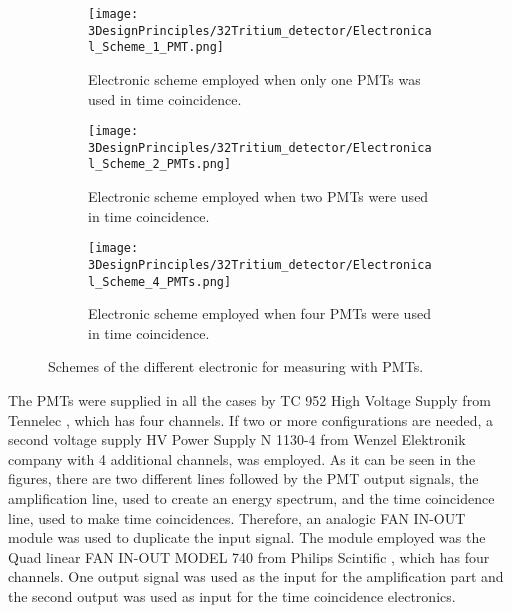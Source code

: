 \begin{figure}
\centering
    \begin{subfigure}[b]{1.0\textwidth}
    \centering
    \texttt{[image: 3DesignPrinciples/32Tritium\_detector/Electronical\_Scheme\_1\_PMT.png]}  
    \caption{Electronic scheme employed when only one PMTs was used in time coincidence.\label{subfig:ElectronicConfiguraiton1PMT}}
    \end{subfigure}
    \hfill
    \begin{subfigure}[b]{1.0\textwidth}
    \centering
    \texttt{[image: 3DesignPrinciples/32Tritium\_detector/Electronical\_Scheme\_2\_PMTs.png]}  
    \caption{Electronic scheme employed when two PMTs were used in time coincidence.\label{subfig:ElectronicConfiguraiton2PMT}}
    \end{subfigure}
    \hfill
    \begin{subfigure}[b]{1.0\textwidth}
    \centering
    \texttt{[image: 3DesignPrinciples/32Tritium\_detector/Electronical\_Scheme\_4\_PMTs.png]}  
    \caption{Electronic scheme employed when four PMTs were used in time coincidence.\label{subfig:ElectronicConfiguraiton4PMT}}
    \end{subfigure}
 \caption{Schemes of the different electronic for measuring with PMTs.}
 \label{fig:ElectronicConfiguraitonsPMT}
\end{figure}

The PMTs were supplied in all the cases by TC 952 High Voltage Supply from Tennelec \cite{DataSheetHVSupplyTennelec}, which has four channels. If two or more configurations are needed, a second voltage supply HV Power Supply N 1130-4 from Wenzel Elektronik company \cite{DataSheetHVSupplyWenzel} with 4 additional channels, was employed. As it can be seen in the figures, there are two different lines followed by the PMT output signals, the amplification line, used to create an energy spectrum, and the time coincidence line, used to make time coincidences. Therefore, an analogic FAN IN-OUT module was used to duplicate the input signal. The module employed was the Quad linear FAN IN-OUT MODEL 740 from Philips Scintific \cite{DataSheetFANINOUT}, which has four channels. One output signal was used as the input for the amplification part and the second output was used as input for the time coincidence electronics.


